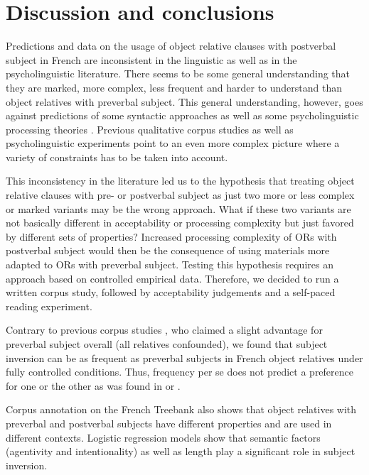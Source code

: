 \documentclass[output=paper]{langscibook}
\begin{document}
\section{Discussion and conclusions}

Predictions and data on the usage of object relative clauses with postverbal subject in French are inconsistent in the linguistic as well as in the psycholinguistic literature. There seems to be some general understanding that they are marked, more complex, less frequent and harder to understand than object relatives with preverbal subject. This general understanding, however, goes against predictions of some syntactic approaches \citep [e.g. relativized minimality,] []{rizzi1990} as well as some psycholinguistic processing theories \citep [e.g. DLT,] []{gibson2000}. Previous qualitative corpus studies \citep{catherine1997} as well as psycholinguistic experiments point to an even more complex picture where a variety of constraints has to be taken into account.

This inconsistency in the literature led us to the hypothesis that treating object relative clauses with pre- or postverbal subject as just two more or less complex or marked variants may be the wrong approach. What if these two variants are not basically different in acceptability or processing complexity but just favored by different sets of properties?  Increased processing complexity of ORs with postverbal subject would then be the consequence of using materials more adapted to ORs with preverbal subject. Testing this hypothesis requires an approach based on controlled empirical data. Therefore, we decided to run a written corpus study, followed by acceptability judgements and a self-paced reading experiment.

Contrary to previous corpus studies \citep{catherine1997}, who claimed a slight advantage for preverbal subject overall (all relatives confounded), we found that subject inversion can be as frequent as preverbal subjects in French object relatives under fully controlled conditions. Thus, frequency per se does not predict a preference for one or the other as was found in \citet{Frauenfelder1980} or \citet{pozniak2015processing}.

Corpus annotation on the French Treebank \citep{abeille2019corpus} also shows that object relatives with preverbal and postverbal subjects have different properties and are used in different contexts. Logistic regression models \citep{baayen2008mixed} show that semantic factors (agentivity and intentionality) as well as length play a significant role in subject inversion. 
\end{document}
